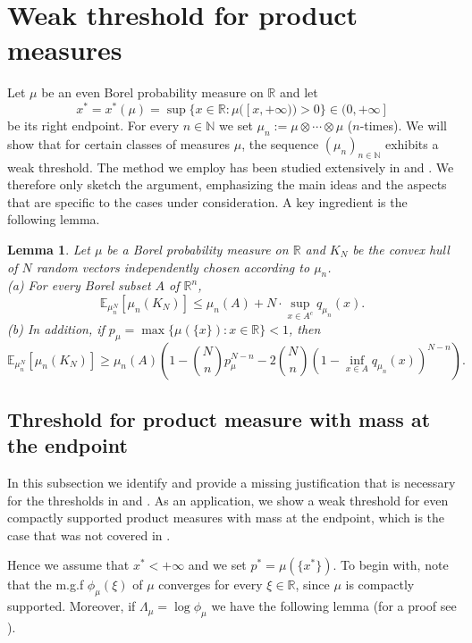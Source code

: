 \documentclass[11pt,a4paper]{article} %
\newtheorem{lemma}[theorem]{Lemma}
\theoremstyle{definition}
\theoremstyle{remark}
\newcommand{\E}{\mathbb{E}}
\newcommand{\1}{\mathds{1}}
\newcommand{\ls}{\le}
\newcommand{\gr}{\ge}
\begin{document}
\section{Weak threshold for product measures}

Let $\mu$ be an even  Borel  probability measure on $\mathbb{R}$ and let $$x^\ast=x^\ast(\mu)=\sup \{ x \in \mathbb{R}: \mu([x,+\infty))>0\} \in (0,+\infty]$$ be its right endpoint. For every $n \in \mathbb{N}$ we set $\mu_n:=\mu\otimes\cdots\otimes\mu$ ($n$-times). We will show that for certain classes of measures $\mu$, the sequence $(\mu_n)_{n \in \mathbb{N}}$ exhibits a weak threshold. The method we employ has been studied extensively in \cite{GaGia} and \cite{Paf}. We therefore only sketch the argument, emphasizing the main ideas and the aspects that are specific to the cases under consideration. A key ingredient is the following lemma.

\begin{lemma}\label{lem:DFM}
Let $\mu$ be a Borel probability measure on $\mathbb{R}$ and $K_N$ be the convex hull of $N$ random vectors independently chosen according to $\mu_n$.\\
{\rm (a)} For every Borel subset $A$ of $\mathbb{R}^n$,
\begin{equation}\label{eq:DFM-lemma-upper}
\E_{\mu_n^N}[\mu_n(K_N)]\ls \mu_n(A)+N\cdot \sup_{x\in A^c}q_{\mu_n}(x).
\end{equation}
{\rm (b)} In addition, if $p_\mu=\max \{\mu(\{x\}): x \in \mathbb{R}\}<1$, then
\begin{equation}\label{eq:DFM-lemma-lower}
\E_{\mu_n^N}[\mu_n(K_N)]\gr \mu_n(A)\left(1-\binom{N}{n}p_\mu^{N-n}-2\binom{N}{n}\left(1-\inf_{x\in A}q_{\mu_n}(x)\right)^{N-n}\right).
\end{equation}
\end{lemma}

\subsection{Threshold for product measure with mass at the endpoint}

In this subsection we identify and provide a missing justification that is necessary for the thresholds in \cite{DFM} and \cite{GaGia}. As an application, we show a weak threshold for even compactly supported product measures with mass at the endpoint, which is the case that was not covered in \cite{Paf}.

Hence we assume that $x^\ast <+\infty$ and we set $p^\ast=\mu(\{x^\ast\})$. To begin with, note that the m.g.f $\phi_{\mu}(\xi)$ of $\mu$ converges for every $\xi \in \mathbb{R}$, since $\mu$ is compactly supported. Moreover, if $\Lambda_\mu=\log \phi_\mu$ we have the following lemma (for a proof see \cite[Lemma 2.3]{GaGia}).
\end{document}
